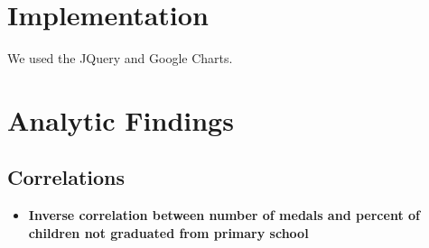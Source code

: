 \documentclass[a4paper]{article}
\begin{document}
\section{Implementation}
We used the JQuery and Google Charts.


\section{Analytic Findings}
\subsection{Correlations}
\begin{itemize}
\item{\textbf{Inverse correlation between number of medals and percent of children not graduated from primary school}}
\end{itemize}
\end{document}
